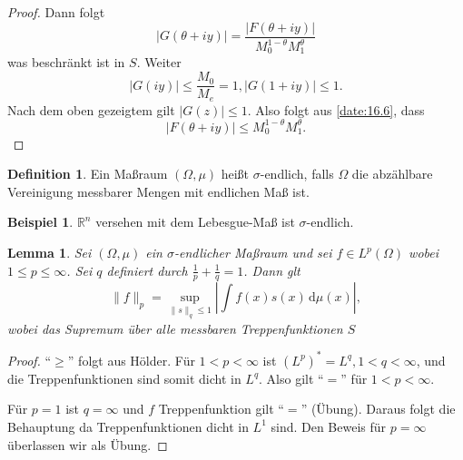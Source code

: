 \documentclass[
paper=a4,
bibtotocnumbered,
liststotocnumbered,
tablecaptionabove,
pointlessnumbers,
twoside,
openright,
10pt
]
{report}
\newtheorem{lem}[thm]{Lemma}
\theoremstyle{definition}
\newtheorem*{df}{Definition}
\newtheorem*{bsp}{Beispiel}
\numberwithin{equation}{chapter}
\begin{document}
\begin{proof}
Dann folgt
\begin{equation}\label{date:16.6}
|G(\theta+iy)| = \frac{|F(\theta + i y)|}{M_0^{1-\theta} M_1^\theta}
\end{equation}
was beschränkt ist in $S$. Weiter
\begin{equation}
|G(iy)|\le \frac{M_0}{M_e} = 1, |G(1+iy)|\le 1.
\end{equation}
Nach dem oben gezeigtem gilt $|G(z)|\le 1$. Also folgt aus \eqref{date:16.6}, dass
\begin{equation}
|F(\theta + iy)| \le M_0^{1-\theta} M_1^\theta.
\end{equation}
\end{proof}

\begin{df}
Ein Maßraum $(\Omega, \mu)$ heißt $\sigma$-endlich, falls $\Omega$ die abzählbare Vereinigung messbarer Mengen mit endlichen Maß ist.
\end{df}
\begin{bsp}
$\mathbb R^n$ versehen mit dem Lebesgue-Maß ist $\sigma$-endlich.
\end{bsp}

\begin{lem}\label{lm2}
Sei $(\Omega, \mu)$ ein $\sigma$-endlicher Maßraum und sei $f\in L^p(\Omega)$ wobei $1\le p \le \infty$.  Sei $q$ definiert durch $\frac{1}{p}+\frac{1}{q} =1$. Dann glt
\begin{equation}
\| f\|_p = \sup_{\| s\|_q \le 1} \left | \int f(x) s(x) \, \mathrm d\mu(x)\right |,
\end{equation}
wobei das Supremum über alle messbaren Treppenfunktionen $S$
\end{lem}
\begin{proof}
``$\ge$'' folgt aus Hölder. Für $1<p<\infty$ ist $(L^p)^*=L^q, 1 <q<\infty$, und die Treppenfunktionen sind somit dicht in $L^q$. Also gilt ``$=$'' für $1<p<\infty$.

Für $p=1$ ist $q=\infty$ und $f$ Treppenfunktion gilt ``$=$''  (Übung). Daraus folgt die Behauptung da Treppenfunktionen dicht in $L^1$ sind.  Den Beweis für $p=\infty$ überlassen wir als Übung.
\end{proof}
\end{document}

